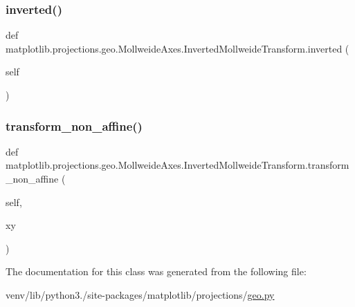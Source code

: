 \subsubsection{\texorpdfstring{inverted()}{inverted()}}
{\footnotesize\ttfamily def matplotlib.\+projections.\+geo.\+Mollweide\+Axes.\+Inverted\+Mollweide\+Transform.\+inverted (\begin{DoxyParamCaption}\item[{}]{self }\end{DoxyParamCaption})}

\mbox{\label{classmatplotlib_1_1projections_1_1geo_1_1MollweideAxes_1_1InvertedMollweideTransform_ab9464fba71ca3d5e0eb2787232d17974}} 
\subsubsection{\texorpdfstring{transform\+\_\+non\+\_\+affine()}{transform\_non\_affine()}}
{\footnotesize\ttfamily def matplotlib.\+projections.\+geo.\+Mollweide\+Axes.\+Inverted\+Mollweide\+Transform.\+transform\+\_\+non\+\_\+affine (\begin{DoxyParamCaption}\item[{}]{self,  }\item[{}]{xy }\end{DoxyParamCaption})}



The documentation for this class was generated from the following file\+:\begin{DoxyCompactItemize}
\item 
venv/lib/python3./site-\/packages/matplotlib/projections/\hyperlink{geo_8py}{geo.\+py}\end{DoxyCompactItemize}
